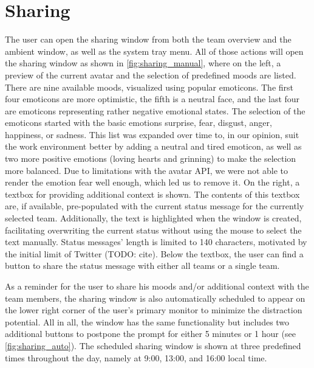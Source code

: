 \section{Sharing}
The user can open the sharing window from both the team overview and the ambient window, as well as the system tray menu. All of those actions will open the sharing window as shown in \autoref{fig:sharing_manual}, where on the left, a preview of the current avatar and the selection of predefined moods are listed. There are nine available moods, visualized using popular emoticons. The first four emoticons are more optimistic, the fifth is a neutral face, and the last four are emoticons representing rather negative emotional states. The selection of the emoticons started with the basic emotions surprise, fear, disgust, anger, happiness, or sadness. This list was expanded over time to, in our opinion, suit the work environment better by adding a neutral and tired emoticon, as well as two more positive emotions (loving hearts and grinning) to make the selection more balanced. Due to limitations with the avatar API, we were not able to render the emotion fear well enough, which led us to remove it. On the right, a textbox for providing additional context is shown. The contents of this textbox are, if available, pre-populated with the current status message for the currently selected team. Additionally, the text is highlighted when the window is created, facilitating overwriting the current status without using the mouse to select the text manually. Status messages' length is limited to 140 characters, motivated by the initial limit of Twitter (TODO: cite). Below the textbox, the user can find a button to share the status message with either all teams or a single team.

As a reminder for the user to share his moods and/or additional context with the team members, the sharing window is also automatically scheduled to appear on the lower right corner of the user's primary monitor to minimize the distraction potential. All in all, the window has the same functionality but includes two additional buttons to postpone the prompt for either 5 minutes or 1 hour (see \autoref{fig:sharing_auto}). The scheduled sharing window is shown at three predefined times throughout the day, namely at 9:00, 13:00, and 16:00 local time.


